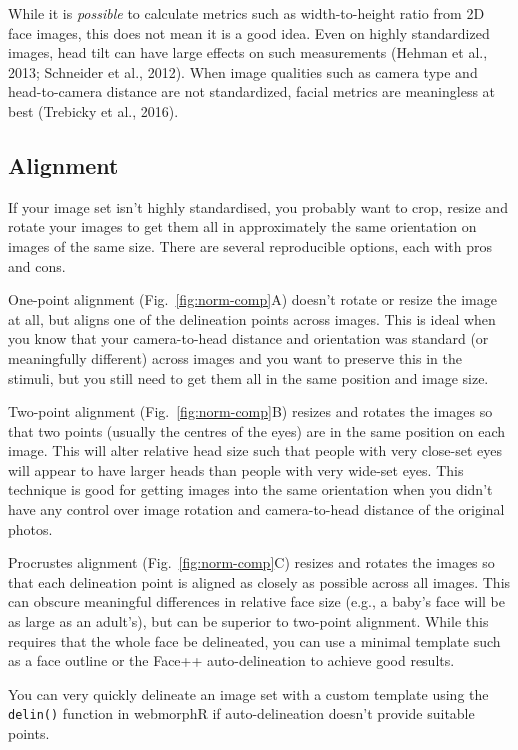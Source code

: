 \documentclass[
  man,floatsintext]{apa6}
\begin{document}
While it is \emph{possible} to calculate metrics such as width-to-height ratio from 2D face images, this does not mean it is a good idea. Even on highly standardized images, head tilt can have large effects on such measurements (Hehman et al., 2013; Schneider et al., 2012). When image qualities such as camera type and head-to-camera distance are not standardized, facial metrics are meaningless at best (Trebicky et al., 2016).

\hypertarget{alignment}{%
\subsection{Alignment}\label{alignment}}

If your image set isn't highly standardised, you probably want to crop, resize and rotate your images to get them all in approximately the same orientation on images of the same size. There are several reproducible options, each with pros and cons.

One-point alignment (Fig.~\ref{fig:norm-comp}A) doesn't rotate or resize the image at all, but aligns one of the delineation points across images. This is ideal when you know that your camera-to-head distance and orientation was standard (or meaningfully different) across images and you want to preserve this in the stimuli, but you still need to get them all in the same position and image size.

Two-point alignment (Fig.~\ref{fig:norm-comp}B) resizes and rotates the images so that two points (usually the centres of the eyes) are in the same position on each image. This will alter relative head size such that people with very close-set eyes will appear to have larger heads than people with very wide-set eyes. This technique is good for getting images into the same orientation when you didn't have any control over image rotation and camera-to-head distance of the original photos.

Procrustes alignment (Fig.~\ref{fig:norm-comp}C) resizes and rotates the images so that each delineation point is aligned as closely as possible across all images. This can obscure meaningful differences in relative face size (e.g., a baby's face will be as large as an adult's), but can be superior to two-point alignment. While this requires that the whole face be delineated, you can use a minimal template such as a face outline or the Face++ auto-delineation to achieve good results.

You can very quickly delineate an image set with a custom template using the \texttt{delin()} function in webmorphR if auto-delineation doesn't provide suitable points.
\end{document}
